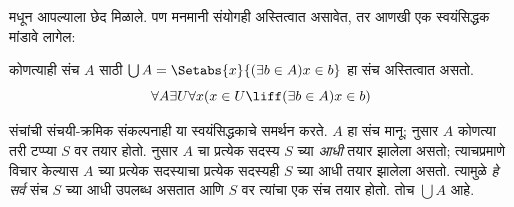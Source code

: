 \documentclass[../../../include/open-logic-section]{subfiles}
\begin{document}

 मधून आपल्याला छेद मिळाले. पण मनमानी संयोगही अस्तित्वात असावेत, तर आणखी एक स्वयंसिद्धक मांडावे लागेल:

\begin{axiom}[संयोग] कोणत्याही संच $A$ साठी $\bigcup A =
\Setabs{x}{(\exists b \in A) x \in b}$ हा संच अस्तित्वात असतो.
\[
	\forall A \exists U \forall x(x \in U \liff (\exists b \in A)x \in b)
\]
\end{axiom}

संचांची संचयी-क्रमिक संकल्पनाही या स्वयंसिद्धकाचे समर्थन करते. $A$ हा संच मानू; \stageshier{} नुसार $A$ कोणत्या तरी टप्प्या $S$ वर तयार होतो. \stagesacc{} नुसार $A$ चा प्रत्येक सदस्य $S$ च्या \emph{आधी} तयार झालेला असतो; त्याचप्रमाणे विचार केल्यास $A$ च्या प्रत्येक सदस्याचा प्रत्येक सदस्यही $S$ च्या आधी तयार झालेला असतो. त्यामुळे \emph{हे सर्व} संच $S$ च्या आधी उपलब्ध असतात आणि $S$ वर त्यांचा एक संच तयार होतो. तोच $\bigcup A$ आहे.
\end{document}
